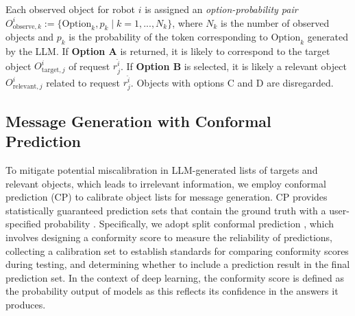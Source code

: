 Each observed object for robot $i$ is assigned an \textit{option-probability pair} $O^{i}_{\text{observe},k} := \{\text{Option}_k, p_k \mid k=1,...,N_{k}\}$, where $N_k$ is the number of observed objects and $p_k$ is the probability of the token corresponding to $\text{Option}_k$ generated by the LLM. 
If  \textbf{Option A} is returned, it is likely to correspond to the target object $O^{i}_{\text{target},j}$ of request $r^{\hat{i}}_j$. 
If \textbf{Option B} is selected, it is likely a relevant object $O^{i}_{\text{relevant},j}$ related to request $r^{\hat{i}}_j$. 
Objects with options C and D are disregarded.

\subsection{Message Generation with Conformal Prediction}

To mitigate potential miscalibration in LLM-generated lists of targets and relevant objects, which leads to irrelevant information, we employ conformal prediction (CP) \cite{shafer2008tutorial} to calibrate object lists for message generation. 
CP provides statistically guaranteed prediction sets that contain the ground truth with a user-specified probability \cite{ren2023robots}.
Specifically, we adopt split conformal prediction \cite{fontana2023conformal}, which involves designing a conformity score to measure the reliability of predictions, collecting a calibration set to establish standards for comparing conformity scores during testing, and determining whether to include a prediction result in the final prediction set. 
In the context of deep learning, the conformity score is defined as the probability output of models as this reflects its confidence in the answers it produces.


